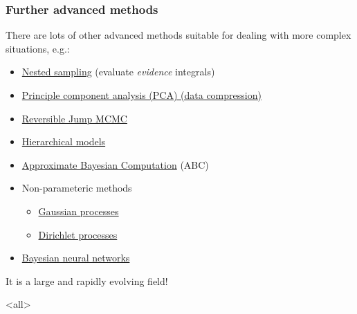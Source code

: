 \begin{frame}

\frametitle{Further advanced methods}
\label{furtheradvancedmethods}

There are lots of other advanced methods suitable for dealing with more complex situations, e.g.:

\begin{itemize}
\item \href{http://en.wikipedia.org/wiki/Nested_sampling_algorithm}{Nested sampling} (evaluate \emph{evidence} integrals)

\item \href{http://en.wikipedia.org/wiki/Principal_component_analysis}{Principle component analysis (PCA) (data compression)}

\item \href{http://en.wikipedia.org/wiki/Reversible-jump_Markov_chain_Monte_Carlo}{Reversible Jump MCMC}

\item \href{http://en.wikipedia.org/wiki/Bayesian_hierarchical_modeling}{Hierarchical models}

\item \href{http://en.wikipedia.org/wiki/Approximate_Bayesian_computation}{Approximate Bayesian Computation} (ABC)

\item Non-parameteric methods

\begin{itemize}
\item \href{http://en.wikipedia.org/wiki/Kriging}{Gaussian processes}

\item \href{http://en.wikipedia.org/wiki/Dirichlet_process}{Dirichlet processes}

\end{itemize}

\item \href{http://en.wikipedia.org/wiki/Bayesian_network}{Bayesian neural networks}

\end{itemize}

It is a large and rapidly evolving field!

\end{frame}

\mode<all>


\mode*

